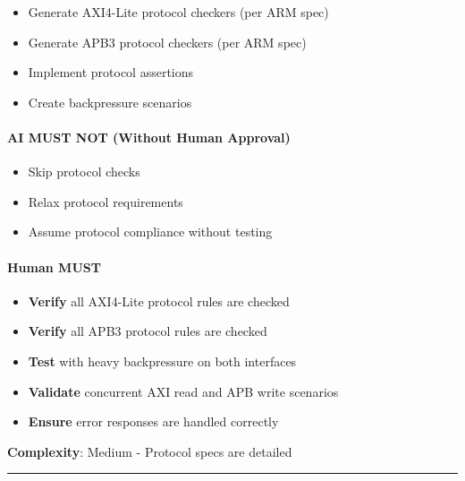 \begin{record}

\begin{itemize}
\tightlist
\item
  Generate AXI4-Lite protocol checkers (per ARM spec)
\item
  Generate APB3 protocol checkers (per ARM spec)
\item
  Implement protocol assertions
\item
  Create backpressure scenarios
\end{itemize}

\end{record}

\paragraph{\texorpdfstring{\warn{} AI MUST NOT (Without Human
Approval)}{ AI MUST NOT (Without Human Approval)}}\label{cr:status:phase1-ai-human-responsibilities:warning-ai-must-not-without-human-approval-14}

\begin{record}

\begin{itemize}
\tightlist
\item
  Skip protocol checks
\item
  Relax protocol requirements
\item
  Assume protocol compliance without testing
\end{itemize}

\end{record}

\paragraph{\texorpdfstring{\hold{} Human MUST}{ Human MUST}}\label{cr:status:phase1-ai-human-responsibilities:raised-hand-human-must-14}

\begin{record}

\begin{itemize}
\tightlist
\item
  \textbf{Verify} all AXI4-Lite protocol rules are checked
\item
  \textbf{Verify} all APB3 protocol rules are checked
\item
  \textbf{Test} with heavy backpressure on both interfaces
\item
  \textbf{Validate} concurrent AXI read and APB write scenarios
\item
  \textbf{Ensure} error responses are handled correctly
\end{itemize}

\textbf{Complexity}: \partialmark{} Medium - Protocol specs are detailed

\begin{center}\rule{0.5\linewidth}{0.5pt}\end{center}

\end{record}

